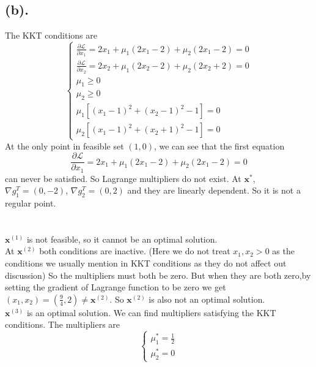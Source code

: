 \documentclass[12pt,letterpaper]{article}
\begin{document}
\subsection*{(b).}
The KKT conditions are
$$
\begin{cases}
\frac{\partial\mathcal{L}}{\partial x_1}=2x_1+\mu_1(2x_1-2)+\mu_2(2x_1-2)=0\\
\frac{\partial\mathcal{L}}{\partial x_2}=2x_2+\mu_1(2x_2-2)+\mu_2(2x_2+2)=0\\
\mu_1\geq0\\
\mu_2\geq0\\
\mu_1[(x_1-1)^2+(x_2-1)^2-1]=0\\
\mu_2[(x_1-1)^2+(x_2+1)^2-1]=0
\end{cases}$$
At the only point in feasible set $(1,0)$, we can see that the first equation $$\frac{\partial\mathcal{L}}{\partial x_1}=2x_1+\mu_1(2x_1-2)+\mu_2(2x_1-2)=0$$
can never be satisfied. So Lagrange multipliers do not exist.
At $\boldsymbol{x}^*$, $\nabla g_1^T=(0,-2)$, $\nabla g_2^T=(0,2)$ and they are linearly dependent. So it is not a regular point. 
\section{}
$\boldsymbol{x}^{(1)}$ is not feasible, so it cannot be an optimal solution.\\
At $\boldsymbol{x}^{(2)}$ both conditions are inactive. (Here we do not treat $x_1,x_2>0$ as the conditions we usually mention in KKT conditions as they do not affect out discussion) So the multipliers must both be zero. But when they are both zero,by setting the gradient of Lagrange function to be zero we get $(x_1,x_2)=(\frac{9}{4},2)\neq \boldsymbol{x}^{(2)}$. So $\boldsymbol{x}^{(2)}$ is also not an optimal solution.\\
$\boldsymbol{x}^{(3)}$ is an optimal solution. We can find multipliers satisfying the KKT conditions. The multipliers are
$$\begin{cases}
\mu_1^*=\frac{1}{2}\\
\mu_2^*=0
\end{cases}
$$
\section{}
\end{document}
